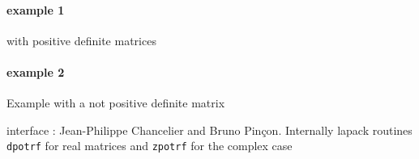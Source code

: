 \begin{examples}
\paragraph{example 1} with positive definite matrices 
  \begin{program}
  \end{program}
  \paragraph{example 2} Example with a not positive definite matrix
  \begin{program}
  \end{program}
\end{examples}

\begin{manseealso}
\end{manseealso}

\begin{authors}
   interface : Jean-Philippe Chancelier and Bruno Pin\c{c}on. Internally lapack routines \verb+dpotrf+ for real matrices 
   and \verb+zpotrf+ for the complex case
\end{authors}


 
 
  
